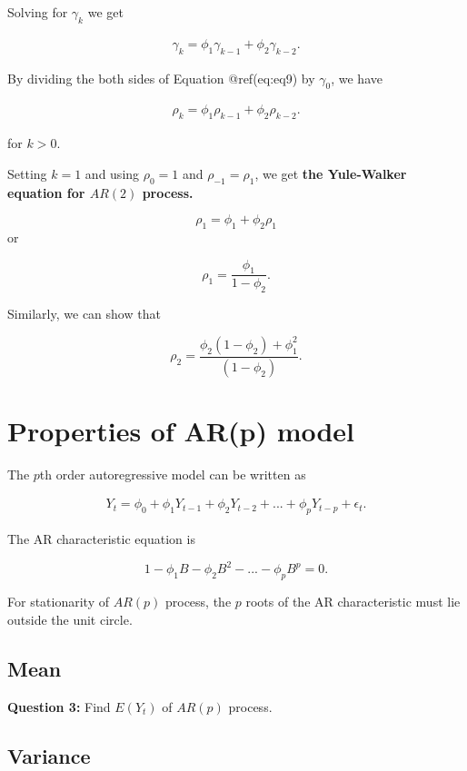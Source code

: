 \documentclass[
  11pt,
  a4paper,
]{report}
\begin{document}
Solving for \(\gamma_k\) we get

\begin{align}
 \gamma_k=\phi_1\gamma_{k-1}+\phi_2\gamma_{k-2}.
\end{align}

By dividing the both sides of Equation @ref(eq:eq9) by \(\gamma_0\), we
have

\begin{align}
 \rho_k=\phi_1\rho_{k-1}+\phi_2\rho_{k-2}.
\end{align}

for \(k>0\).

Setting \(k=1\) and using \(\rho_0=1\) and \(\rho_{-1}=\rho_1\), we get
\textbf{the Yule-Walker equation for \(AR(2)\) process.}

\[\rho_1=\phi_1+\phi_2 \rho_1\] or

\[\rho_1 = \frac{\phi_1}{1-\phi_2}.\]

Similarly, we can show that

\[\rho_2 = \frac{\phi_2(1-\phi_2)+\phi_1^2}{(1-\phi_2)}.\]

\section{Properties of AR(p) model}\label{properties-of-arp-model}

The \(p\)th order autoregressive model can be written as

\begin{align}
Y_t = \phi_0 + \phi_1Y_{t-1}+\phi_2 Y_{t-2}+ ... + \phi_p Y_{t-p}+\epsilon_t.
\end{align}

The AR characteristic equation is

\[1-\phi_1B-\phi_2B^2-...-\phi_pB^p=0.\]

For stationarity of \(AR(p)\) process, the \(p\) roots of the AR
characteristic must lie outside the unit circle.

\subsection{Mean}\label{mean-2}

\textbf{Question 3: } Find \(E(Y_t)\) of \(AR(p)\) process.

\subsection{Variance}\label{variance-1}
\end{document}
